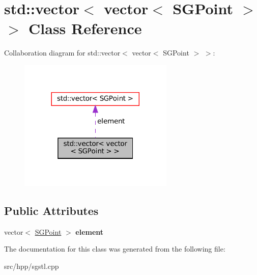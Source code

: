 \hypertarget{classstd_1_1vector_3_01vector_3_01SGPoint_01_4_01_4}{}\section{std\+:\+:vector$<$ vector$<$ S\+G\+Point $>$ $>$ Class Reference}
\label{classstd_1_1vector_3_01vector_3_01SGPoint_01_4_01_4}


Collaboration diagram for std\+:\+:vector$<$ vector$<$ S\+G\+Point $>$ $>$\+:
\nopagebreak
\begin{figure}[H]
\begin{center}
\leavevmode
\includegraphics[width=209pt]{classstd_1_1vector_3_01vector_3_01SGPoint_01_4_01_4__coll__graph}
\end{center}
\end{figure}
\subsection*{Public Attributes}
\begin{DoxyCompactItemize}
\item 
\mbox{\label{classstd_1_1vector_3_01vector_3_01SGPoint_01_4_01_4_a8eec14d8acffbfc3edd114bfc7455390}} 
vector$<$ \hyperlink{classSGPoint}{S\+G\+Point} $>$ {\bfseries element}
\end{DoxyCompactItemize}


The documentation for this class was generated from the following file\+:\begin{DoxyCompactItemize}
\item 
src/hpp/sgstl.\+cpp\end{DoxyCompactItemize}
